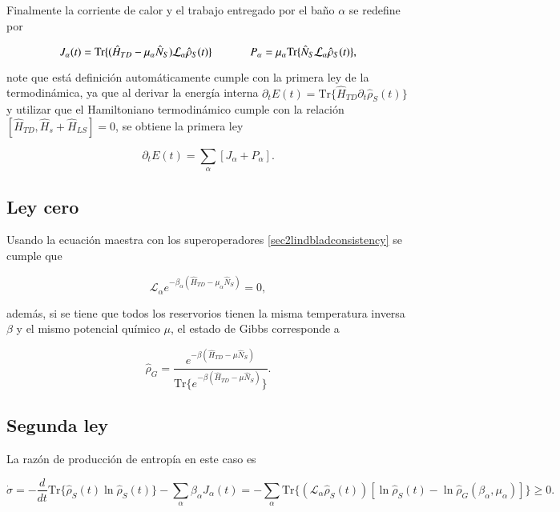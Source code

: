 Finalmente la corriente de calor y el trabajo entregado por el baño $\alpha$ se redefine por

\begin{equation*}
    J_{\alpha}(t) = \text{Tr}\{(\hat{H}_{TD} - \mu_{\alpha}\hat{N}_S)\mathcal{L}_{\alpha}\hat{\rho}_{S}(t) \} \hspace{12mm} P_{\alpha} = \mu_{\alpha} \text{Tr}\{\hat{N}_{S}\mathcal{L}_{\alpha}\hat{\rho}_{S}(t) \} ,
\end{equation*}

note que está definición automáticamente cumple con la primera ley de la termodinámica, ya que al derivar la energía interna $\partial_{t}E(t) = \text{Tr}\{ \hat{H}_{TD}\partial_{t}\hat{\rho}_{S}(t) \}$ y utilizar que el Hamiltoniano termodinámico cumple con la relación $[\hat{H}_{TD},\hat{H}_{s} + \hat{H}_{LS}] = 0$, se obtiene la primera ley

\begin{equation*}
    \partial_{t}E(t) = \sum_{\alpha}[J_{\alpha} + P_{\alpha}].
\end{equation*}

\subsection{Ley cero}
Usando la ecuación maestra con los superoperadores \ref{sec2lindbladconsistency} se cumple que

\begin{equation}
    \mathcal{L}_{\alpha}e^{-\beta_{\alpha}(\hat{H}_{TD} - \mu_{\alpha}\hat{N}_{S})} = 0,
\label{sec2cerolaw}
\end{equation}

además, si se tiene que todos los reservorios tienen la misma temperatura inversa $\beta$ y el mismo potencial químico $\mu$, el estado de Gibbs corresponde a 

\begin{equation*}
    \hat{\rho}_G = \frac{e^{-\beta(\hat{H}_{TD} - \mu \hat{N}_{S})}}{\text{Tr}\{ e^{-\beta(\hat{H}_{TD} - \mu \hat{N}_{S})}\}}.
\end{equation*}

\subsection{Segunda ley}
La razón de producción de entropía en este caso es 

\begin{equation}
    \dot{\sigma} = - \frac{d}{dt}\text{Tr}\{\hat{\rho}_{S}(t) \ln \hat{\rho}_{S}(t) \} - \sum_{\alpha} \beta_{\alpha} J_{\alpha}(t) = -\sum_{\alpha} \text{Tr}\{(\mathcal{L}_{\alpha}\hat{\rho}_{S}(t))[\ln \hat{\rho}_{S}(t) - \ln \hat{\rho}_{G}(\beta_{\alpha},\mu_{\alpha})] \} \geq 0.
\label{sec2secondlaw}
\end{equation}

